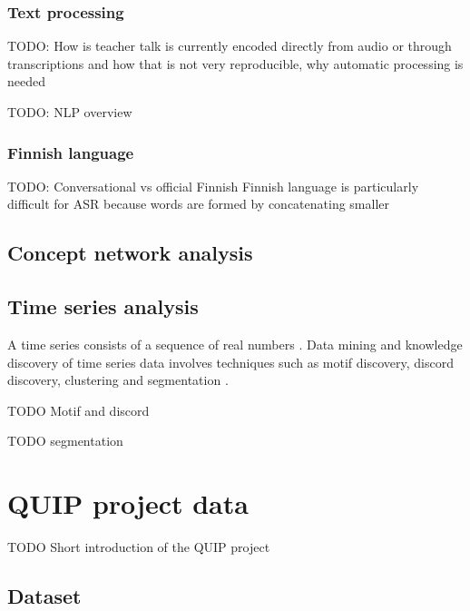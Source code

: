 \documentclass[utf8,english]{gradu3}
\begin{document}
\subsection{Text processing}
TODO: How is teacher talk is currently encoded directly from audio or through transcriptions and how that is not very reproducible, why automatic processing is needed

TODO: NLP overview \parencite{silfverbergFinnPosOpensourceMorphological2016, kanervaTurkuNeuralParser2018}


\subsection{Finnish language}
TODO: Conversational vs official Finnish
Finnish language is particularly difficult for ASR because words are formed by concatenating smaller \parencite{enarviAutomaticSpeechRecognition2017}

\section{Concept network analysis}

\section{Time series analysis}
A time series consists of a sequence of real numbers \parencite{yehMatrixProfileVI2017}. Data mining and knowledge discovery of time series data involves techniques such as motif discovery, discord discovery, clustering and segmentation \parencite{yehUniversalTimeSeries2018}.

TODO Motif and discord

TODO segmentation




\chapter{QUIP project data}

TODO Short introduction of the QUIP project

\section{Dataset}
\end{document}
